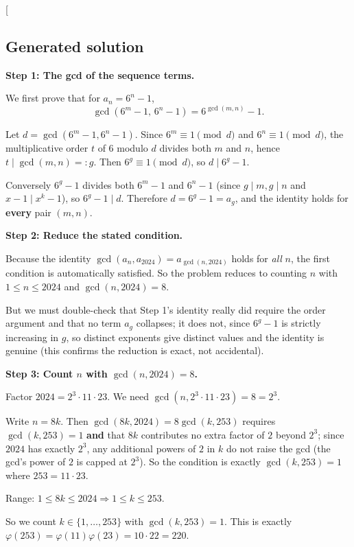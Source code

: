 \documentclass[
  11pt,
  letterpaper,
]{article}
\begin{document}
{[}\boxed{21}{]}

\subsection{Generated solution}\label{generated-solution-7}

\textbf{Step 1: The gcd of the sequence terms.}

We first prove that for \(a_n = 6^n - 1\),
\[\gcd(6^m - 1,\, 6^n - 1) = 6^{\gcd(m,n)} - 1.\]

Let \(d = \gcd(6^m-1, 6^n-1)\). Since \(6^m \equiv 1 \pmod d\) and
\(6^n \equiv 1 \pmod d\), the multiplicative order \(t\) of \(6\) modulo
\(d\) divides both \(m\) and \(n\), hence \(t \mid \gcd(m,n) =: g\).
Then \(6^g \equiv 1 \pmod d\), so \(d \mid 6^g - 1\).

Conversely \(6^g - 1\) divides both \(6^m - 1\) and \(6^n - 1\) (since
\(g \mid m, g\mid n\) and \(x - 1 \mid x^k - 1\)), so
\(6^g - 1 \mid d\). Therefore \(d = 6^g - 1 = a_g\), and the identity
holds for \textbf{every} pair \((m,n)\).

\textbf{Step 2: Reduce the stated condition.}

Because the identity \(\gcd(a_n, a_{2024}) = a_{\gcd(n,2024)}\) holds
for \emph{all} \(n\), the first condition is automatically satisfied. So
the problem reduces to counting \(n\) with \(1 \le n \le 2024\) and
\(\gcd(n, 2024) = 8\).

But we must double-check that Step 1's identity really did require the
order argument and that no term \(a_g\) collapses; it does not, since
\(6^g-1\) is strictly increasing in \(g\), so distinct exponents give
distinct values and the identity is genuine (this confirms the reduction
is exact, not accidental).

\textbf{Step 3: Count \(n\) with \(\gcd(n,2024) = 8\).}

Factor \(2024 = 2^3 \cdot 11 \cdot 23\). We need
\(\gcd(n, 2^3\cdot 11 \cdot 23) = 8 = 2^3\).

Write \(n = 8k\). Then \(\gcd(8k, 2024) = 8\gcd(k, 253)\) requires
\(\gcd(k,253) = 1\) \textbf{and} that \(8k\) contributes no extra factor
of \(2\) beyond \(2^3\); since \(2024\) has exactly \(2^3\), any
additional powers of \(2\) in \(k\) do not raise the gcd (the gcd's
power of \(2\) is capped at \(2^3\)). So the condition is exactly
\(\gcd(k, 253) = 1\) where \(253 = 11\cdot 23\).

Range: \(1 \le 8k \le 2024 \Rightarrow 1 \le k \le 253\).

So we count \(k \in \{1, \dots, 253\}\) with \(\gcd(k, 253) = 1\). This
is exactly
\(\varphi(253) = \varphi(11)\varphi(23) = 10 \cdot 22 = 220\).
\end{document}
